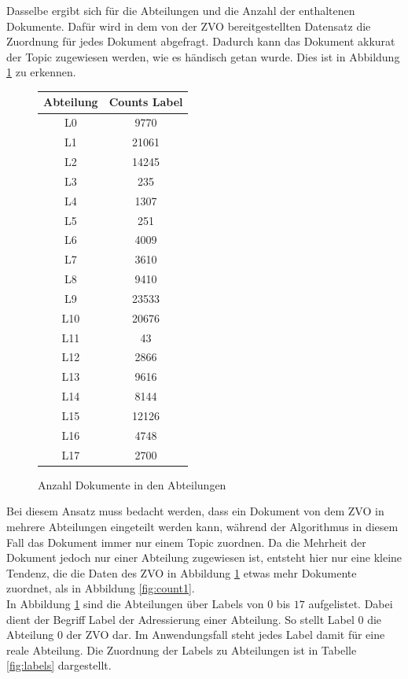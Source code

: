 \documentclass[german,version-2020-11]{uzl-thesis}
\begin{document}
Dasselbe ergibt sich für die Abteilungen und die Anzahl der enthaltenen Dokumente. Dafür wird in dem von der ZVO bereitgestellten Datensatz die Zuordnung für jedes Dokument abgefragt. Dadurch kann das Dokument akkurat der Topic zugewiesen werden, wie es händisch getan wurde. Dies ist in Abbildung \ref{fig:count2} zu erkennen. \\ 

\begin{figure}[H]
\begin{center}
\begin{tabular}{cc}
\hline
\hline
Abteilung & Counts Label\\
\hline
L0&9770\\
L1&21061\\
L2&14245\\
L3&235\\
L4&1307\\
L5&251\\
L6&4009\\
L7&3610\\
L8&9410\\
L9&23533\\
L10&20676\\
L11&43\\
L12&2866\\
L13&9616\\
L14&8144\\
L15&12126\\
L16&4748\\
L17&2700\\
\hline
\hline
\end{tabular}
\caption{Anzahl Dokumente in den Abteilungen}
\label{fig:count2}
\end{center}
\end{figure}

Bei diesem Ansatz muss bedacht werden, dass ein Dokument von dem ZVO in mehrere Abteilungen eingeteilt werden kann, während der Algorithmus in diesem Fall das Dokument immer nur einem Topic zuordnen. Da die Mehrheit der Dokument jedoch nur einer Abteilung zugewiesen ist, entsteht hier nur eine kleine Tendenz, die die Daten des ZVO in Abbildung \ref{fig:count2} etwas mehr Dokumente zuordnet, als in Abbildung \ref{fig:count1}.\\

In Abbildung \ref{fig:count2} sind die Abteilungen über Labels von $0$ bis $17$ aufgelistet. Dabei dient der Begriff Label der Adressierung einer Abteilung. So stellt Label 0 die Abteilung 0 der ZVO dar. Im Anwendungsfall steht jedes Label damit für eine reale Abteilung. Die Zuordnung der Labels zu Abteilungen ist in Tabelle \ref{fig:labels} dargestellt.
\end{document}
